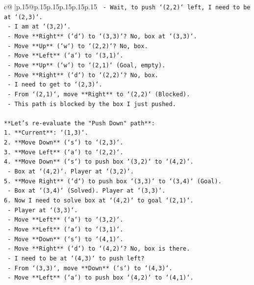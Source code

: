 \documentclass{article}
\begin{document}
{\begin{supertabular}{c@{$\;$}|p{.15\linewidth}@{}p{.15\linewidth}p{.15\linewidth}p{.15\linewidth}p{.15\linewidth}p{.15\linewidth}}
{{{\texttt{   {-} Wait, to push `(2,2)` left, I need to be at `(2,3)`.} \\
\texttt{   {-} I am at `(3,2)`.} \\
\texttt{   {-} Move **Right** (`d`) to `(3,3)`? No, box at `(3,3)`.} \\
\texttt{   {-} Move **Up** (`w`) to `(2,2)`? No, box.} \\
\texttt{   {-} Move **Left** (`a`) to `(3,1)`.} \\
\texttt{   {-} Move **Up** (`w`) to `(2,1)` (Goal, empty).} \\
\texttt{   {-} Move **Right** (`d`) to `(2,2)`? No, box.} \\
\texttt{   {-} I need to get to `(2,3)`.} \\
\texttt{   {-} From `(2,1)`, move **Right** to `(2,2)` (Blocked).} \\
\texttt{   {-} This path is blocked by the box I just pushed.} \\
\\ 
\texttt{**Let's re{-}evaluate the "Push Down" path**:} \\
\texttt{1. **Current**: `(1,3)`.} \\
\texttt{2. **Move Down** (`s`) to `(2,3)`.} \\
\texttt{3. **Move Left** (`a`) to `(2,2)`.} \\
\texttt{4. **Move Down** (`s`) to push box `(3,2)` to `(4,2)`.} \\
\texttt{   {-} Box at `(4,2)`. Player at `(3,2)`.} \\
\texttt{5. **Move Right** (`d`) to push box `(3,3)` to `(3,4)` (Goal).} \\
\texttt{   {-} Box at `(3,4)` (Solved). Player at `(3,3)`.} \\
\texttt{6. Now I need to solve box at `(4,2)` to goal `(2,1)`.} \\
\texttt{   {-} Player at `(3,3)`.} \\
\texttt{   {-} Move **Left** (`a`) to `(3,2)`.} \\
\texttt{   {-} Move **Left** (`a`) to `(3,1)`.} \\
\texttt{   {-} Move **Down** (`s`) to `(4,1)`.} \\
\texttt{   {-} Move **Right** (`d`) to `(4,2)`? No, box is there.} \\
\texttt{   {-} I need to be at `(4,3)` to push left?} \\
\texttt{     {-} From `(3,3)`, move **Down** (`s`) to `(4,3)`.} \\
\texttt{     {-} Move **Left** (`a`) to push box `(4,2)` to `(4,1)`.} \\
}}}
\end{supertabular}}
\end{document}
